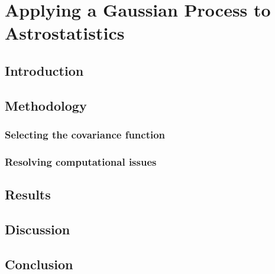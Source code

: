 \section{Applying a Gaussian Process to Astrostatistics}
% 
% 
% 
% 
% 
% 
% 
% 


\subsection{Introduction}



\subsection{Methodology}


\subsubsection{Selecting the covariance function}


\subsubsection{Resolving computational issues}


\subsection{Results}


\subsection{Discussion}


\subsection{Conclusion}
